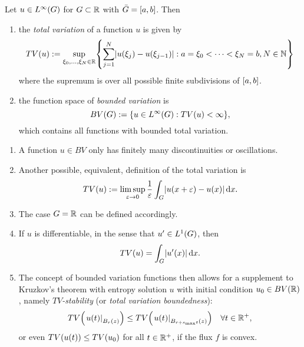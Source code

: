 \begin{definition}
	Let \(u \in L^\infty\parentheses*{G}\) for \(G \subset \R\) with \(\bar{G} = \brackets*{a, b}\).
	Then
	\begin{enumerate}
		\item the \emph{total variation} of a function \(u\) is given by
		\[
			TV\parentheses*{u} := \sup_{\xi_0, \ldots, \xi_N \in \R}\braces*{\sum_{j = 1}^N \absolute*{u\parentheses*{\xi_j} - u\parentheses*{\xi_{j - 1}}} : a = \xi_0 < \cdots < \xi_N = b, N \in \N}
		\]
		where the supremum is over all possible finite subdivisions of \(\brackets*{a, b}\).
		\item the function space of \emph{bounded variation} is
		\[
			BV\parentheses*{G} := \braces*{u \in L^\infty\parentheses*{G} : TV\parentheses*{u} < \infty},
		\]
		which contains all functions with bounded total variation.
	\end{enumerate}
\end{definition}

\begin{remark}
	\begin{enumerate}
		\item A function \(u \in BV\) only has finitely many discontinuities or oscillations.
		\item Another possible, equivalent, definition of the total variation is
		\[
			TV\parentheses*{u} := \limsup_{\varepsilon \to 0}\frac{1}{\varepsilon}\int_G \absolute*{u\parentheses*{x + \varepsilon} - u\parentheses*{x}}\d x.
		\]
		\item The case \(G = \R\) can be defined accordingly.
		\item If \(u\) is differentiable, in the sense that \(u' \in L^1\parentheses*{G}\), then
		\[
			TV\parentheses*{u} = \int_G \absolute*{u'\parentheses*{x}}\d x.
		\]
		\item The concept of bounded variation functions then allows for a supplement to Kruzkov's theorem with entropy solution \(u\) with initial condition \(u_0 \in BV\parentheses*{\R}\), namely \emph{\(TV\)-stability} (or \emph{total variation boundedness}):
		\[
			TV\parentheses*{\left.u\parentheses*{t}\right|_{B_r\parentheses*{z}}} \le TV\parentheses*{\left.u\parentheses*{t}\right|_{B_{r + s_{\text{max}}t}\parentheses*{z}}} \quad \forall t \in \R^+,
		\]
		or even \(TV\parentheses*{u\parentheses*{t}} \le TV\parentheses*{u_0}\) for all \(t \in \R^+\), if the flux \(f\) is convex.
	\end{enumerate}
\end{remark}

